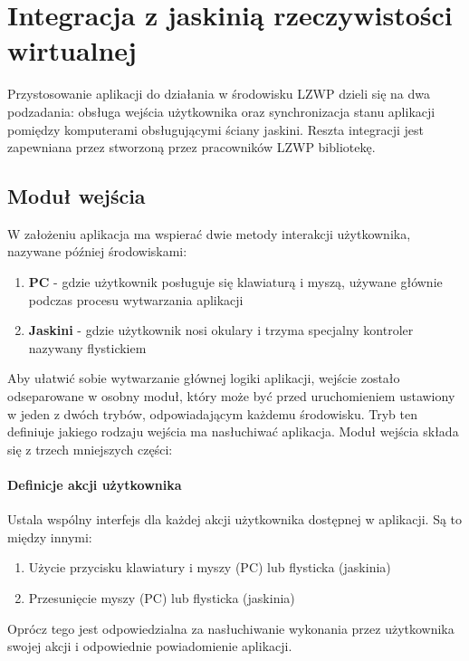 \section{Integracja z jaskinią rzeczywistości wirtualnej}

Przystosowanie aplikacji do działania w środowisku LZWP dzieli się na dwa podzadania: obsługa wejścia użytkownika oraz synchronizacja stanu aplikacji pomiędzy komputerami obsługującymi ściany jaskini. Reszta integracji jest zapewniana przez stworzoną przez pracowników LZWP bibliotekę.

\subsection{Moduł wejścia}
W założeniu aplikacja ma wspierać dwie metody interakcji użytkownika, nazywane później środowiskami:
\begin{enumerate}[label=\textbullet]
	\item \textbf{PC} - gdzie użytkownik posługuje się klawiaturą i myszą, używane głównie podczas procesu wytwarzania aplikacji
	\item \textbf{Jaskini} - gdzie użytkownik nosi okulary i trzyma specjalny kontroler nazywany flystickiem
\end{enumerate}
Aby ułatwić sobie wytwarzanie głównej logiki aplikacji, wejście zostało odseparowane w osobny moduł, który może być przed uruchomieniem ustawiony w jeden z dwóch trybów, odpowiadającym każdemu środowisku. Tryb ten definiuje jakiego rodzaju wejścia ma nasłuchiwać aplikacja. Moduł wejścia składa się z trzech mniejszych części:
\paragraph{Definicje akcji użytkownika}
Ustala wspólny interfejs dla każdej akcji użytkownika dostępnej w aplikacji. Są to między innymi: 
\begin{enumerate}[label=\textbullet]
	\item Użycie przycisku klawiatury i myszy (PC) lub flysticka (jaskinia)
	\item Przesunięcie myszy (PC) lub flysticka (jaskinia)
\end{enumerate}
Oprócz tego jest odpowiedzialna za nasłuchiwanie wykonania przez użytkownika swojej akcji i odpowiednie powiadomienie aplikacji.

